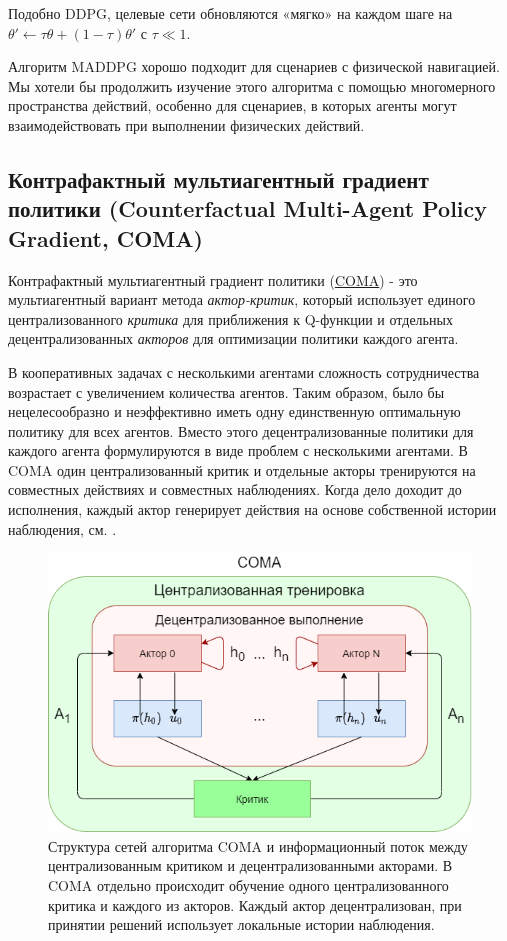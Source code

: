 Подобно DDPG, целевые сети обновляются «мягко» на каждом шаге на $\theta' \leftarrow \tau \theta + (1 - \tau) \theta'$ с $\tau \ll 1$.

Алгоритм MADDPG хорошо подходит для сценариев с физической навигацией. Мы хотели бы продолжить изучение этого алгоритма с помощью многомерного пространства действий, особенно для сценариев, в которых агенты могут взаимодействовать при выполнении физических действий.

\subsection{Контрафактный мультиагентный градиент политики (Counterfactual Multi-Agent Policy Gradient, COMA)}

Контрафактный мультиагентный градиент политики (\hyperref[acr:coma]{COMA}) - это мультиагентный вариант метода \textit{актор-критик}, который использует единого централизованного \textit{критика} для приближения к Q-функции и отдельных децентрализованных \textit{акторов} для оптимизации политики каждого агента. \cite{foerster2017counterfactual}

В кооперативных задачах с несколькими агентами сложность сотрудничества возрастает с увеличением количества агентов. Таким образом, было бы нецелесообразно и неэффективно иметь одну единственную оптимальную политику для всех агентов. Вместо этого децентрализованные политики для каждого агента формулируются в виде проблем с несколькими агентами. В COMA один централизованный критик и отдельные акторы тренируются на совместных действиях и совместных наблюдениях. Когда дело доходит до исполнения, каждый актор генерирует действия на основе собственной истории наблюдения, см. .

\begin{figure}[ht!]
    \center
    \includegraphics [scale=0.80] {my_folder/images/ch2/coma.png}
    \caption{Структура сетей алгоритма COMA и информационный поток между централизованным критиком и децентрализованными акторами. В COMA отдельно происходит обучение одного централизованного критика и каждого из акторов. Каждый актор децентрализован, при принятии решений использует локальные истории наблюдения. \cite{foerster2017counterfactual}}
    \label{fig:ch2-coma}
\end{figure}

